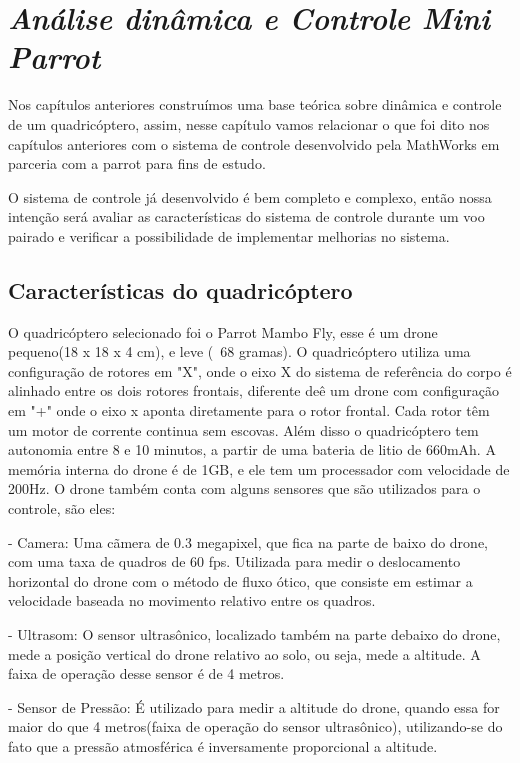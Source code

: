 \chapter{\textit{Análise dinâmica e Controle Mini Parrot}}

Nos capítulos anteriores construímos uma base teórica sobre dinâmica e controle de um quadricóptero, assim, nesse capítulo vamos relacionar o que foi dito nos capítulos anteriores com o sistema de controle desenvolvido pela MathWorks em parceria com a parrot para fins de estudo. 

O sistema de controle já desenvolvido é bem completo e complexo, então nossa intenção será avaliar as características do sistema de controle durante um voo pairado e verificar a possibilidade de implementar melhorias no sistema.

\section{Características do quadricóptero}

O quadricóptero selecionado foi o Parrot Mambo Fly, esse é um drone pequeno(18 x 18 x 4 cm), e leve (~68 gramas). O quadricóptero utiliza uma configuração de rotores em "X", onde o eixo X do sistema de referência do corpo é alinhado entre os dois rotores frontais, diferente deê um drone com configuração em "+" onde o eixo x aponta diretamente para o rotor frontal. Cada rotor têm um motor de corrente continua sem escovas. Além disso o quadricóptero tem autonomia entre 8 e 10 minutos, a partir de uma bateria de litio de 660mAh. A memória interna do drone é de 1GB, e ele tem um processador com velocidade de 200Hz. O drone também conta com alguns sensores que são utilizados para o controle, são eles:

- Camera: Uma cãmera de 0.3 megapixel, que fica na parte de baixo do drone, com uma taxa de quadros de 60 fps. Utilizada para medir o deslocamento horizontal do drone com o método de fluxo ótico, que consiste em estimar a velocidade baseada no movimento relativo entre os quadros.

- Ultrasom: O sensor ultrasônico, localizado também na parte debaixo do drone, mede a posição vertical do drone relativo ao solo, ou seja, mede a altitude. A faixa de operação desse sensor é de 4 metros. 

- Sensor de Pressão: É utilizado para medir a altitude do drone, quando essa for maior do que 4 metros(faixa de operação do sensor ultrasônico), utilizando-se do fato que a pressão atmosférica é inversamente proporcional a altitude.

